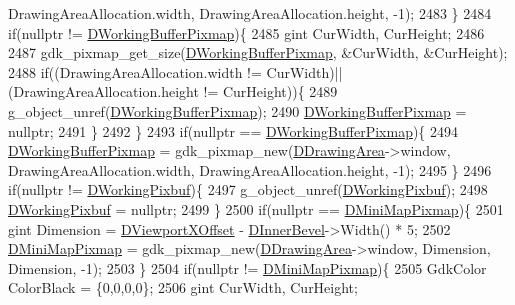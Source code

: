 \begin{DoxyCode}
{      DrawingAreaAllocation.width, DrawingAreaAllocation.height, -1);
2483     \}
2484     \textcolor{keywordflow}{if}(\textcolor{keyword}{nullptr} != \hyperlink{classCApplicationData_afa34cf2780f38dd28c0c811e69d60a97}{DWorkingBufferPixmap})\{
2485         gint CurWidth, CurHeight;
2486         
2487         gdk\_pixmap\_get\_size(\hyperlink{classCApplicationData_afa34cf2780f38dd28c0c811e69d60a97}{DWorkingBufferPixmap}, &CurWidth, &CurHeight); 
2488         \textcolor{keywordflow}{if}((DrawingAreaAllocation.width != CurWidth)||(DrawingAreaAllocation.height != CurHeight))\{
2489             g\_object\_unref(\hyperlink{classCApplicationData_afa34cf2780f38dd28c0c811e69d60a97}{DWorkingBufferPixmap});
2490             \hyperlink{classCApplicationData_afa34cf2780f38dd28c0c811e69d60a97}{DWorkingBufferPixmap} = \textcolor{keyword}{nullptr};
2491         \}
2492     \}
2493     \textcolor{keywordflow}{if}(\textcolor{keyword}{nullptr} == \hyperlink{classCApplicationData_afa34cf2780f38dd28c0c811e69d60a97}{DWorkingBufferPixmap})\{
2494         \hyperlink{classCApplicationData_afa34cf2780f38dd28c0c811e69d60a97}{DWorkingBufferPixmap} = gdk\_pixmap\_new(\hyperlink{classCApplicationData_a4735f5d31632313e0b2a1659eb178987}{DDrawingArea}->window, 
      DrawingAreaAllocation.width, DrawingAreaAllocation.height, -1);
2495     \}
2496     \textcolor{keywordflow}{if}(\textcolor{keyword}{nullptr} != \hyperlink{classCApplicationData_a19355c8cf25f216019db728219185119}{DWorkingPixbuf})\{
2497         g\_object\_unref(\hyperlink{classCApplicationData_a19355c8cf25f216019db728219185119}{DWorkingPixbuf});
2498         \hyperlink{classCApplicationData_a19355c8cf25f216019db728219185119}{DWorkingPixbuf} = \textcolor{keyword}{nullptr};
2499     \}
2500     \textcolor{keywordflow}{if}(\textcolor{keyword}{nullptr} == \hyperlink{classCApplicationData_abe3af81659ead5113b7b2f165a88e737}{DMiniMapPixmap})\{
2501         gint Dimension = \hyperlink{classCApplicationData_a306bba873ccc47126111305fe21ef3ff}{DViewportXOffset} - \hyperlink{classCApplicationData_a29a687c44dceb9e87a56d96612d59ab5}{DInnerBevel}->Width() * 5;
2502         \hyperlink{classCApplicationData_abe3af81659ead5113b7b2f165a88e737}{DMiniMapPixmap} = gdk\_pixmap\_new(\hyperlink{classCApplicationData_a4735f5d31632313e0b2a1659eb178987}{DDrawingArea}->window, Dimension, 
      Dimension, -1);   
2503     \}
2504     \textcolor{keywordflow}{if}(\textcolor{keyword}{nullptr} != \hyperlink{classCApplicationData_abe3af81659ead5113b7b2f165a88e737}{DMiniMapPixmap})\{
2505         GdkColor ColorBlack = \{0,0,0,0\};
2506         gint CurWidth, CurHeight;
}
\end{DoxyCode}
